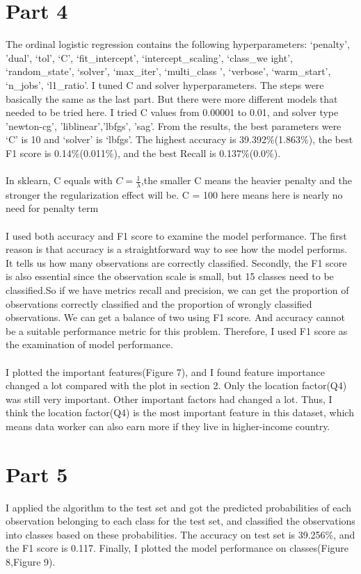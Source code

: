 \documentclass[10pt,onecolumn,letterpaper]{article}
\begin{document}
\section*{Part 4}
The ordinal logistic regression contains the following hyperparameters: ‘penalty’, ’dual’, ‘tol’, ‘C’, ‘fit\_intercept’, ‘intercept\_scaling’, ‘class\_we ight’, ‘random\_state’, ‘solver’, ‘max\_iter’, ‘multi\_class ’, ‘verbose’, ‘warm\_start’, ‘n\_jobs’, ‘l1\_ratio’.  I tuned C and solver hyperparameters. The steps were basically the same as the last part. But there were more different models that needed to be tried here. I tried C values from 0.00001 to 0.01, and solver type 'newton-cg', 'liblinear','lbfgs',  'sag'. From the results, the best parameters were  ‘C’ is 10 and ‘solver’ is ‘lbfgs'. The highest accuracy is 39.392\%(1.863\%), the best F1 score is 0.14\%(0.011\%), and the best Recall is 0.137\%(0.0\%).\\\\
In sklearn, C equals with $C=\frac{1}{\lambda}$,the smaller C means the heavier penalty and the stronger the regularization effect will be. C = 100 here means here is nearly no need for penalty term\\\\
I used both accuracy and F1 score to examine the model performance. The first reason is that accuracy is a straightforward way to see how the model performs. It tells us how many observations are correctly classified. Secondly, the F1 score is also essential since the observation scale is small, but 15 classes need to be classified.So if we have metrics recall and precision, we can get the proportion of observations correctly classified and the proportion of wrongly classified observations. We can get a balance of two using F1 score. And accuracy cannot be a suitable performance metric for this problem. Therefore, I used F1 score as the examination of model performance.\\\\
I plotted the important features(Figure 7), and I found feature importance changed a lot compared with the plot in section 2. Only the location factor(Q4) was still very important. Other important factors had changed a lot. Thus, I think the location factor(Q4) is the most important feature in this dataset, which means data worker can also earn more if they live in higher-income country.

\section*{Part 5}
I applied the algorithm to the test set and got the predicted probabilities of each observation belonging to each class for the test set, and classified the observations into classes based on these probabilities. The accuracy on test set is 39.256\%,  and the F1 score is 0.117. Finally, I plotted the model performance on classes(Figure 8,Figure 9). \\\\
\end{document}
